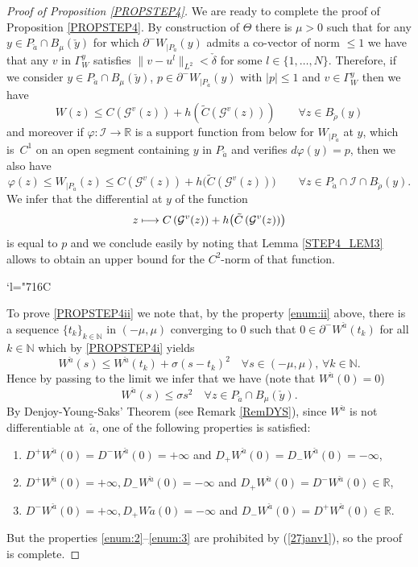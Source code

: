 \documentclass[JEP,XML,SOM,Unicode,NoFloatCountersInSection,published]{cedram}
\newcommand{\Changelback}{\mathcode`l="716C}
\newcommand\mto{\mathchoice{\longmapsto}{\mapsto}{\mapsto}{\mapsto}}
\newcommand\R{\mathbb R}
\newcommand\N{\mathbb N}
\theoremstyle{definition}
\begin{document}
\begin{proof}[Proof of Proposition \ref{PROPSTEP4}]
We are ready to complete the proof of Proposition \ref{PROPSTEP4}. By construction of $\Theta$ there is $\mu>0$ such that for any $y\in P_{\check{a}} \cap B_{\mu}(\check{y})$ for which $\partial^-W_{|P_{\check{a}}}(y)$ admits a co-vector of norm $\leq 1$ we have that any $v$ in $\Gamma_W^y$ satisfies $\|v-u^l\|_{L^2} < \check{\delta}$ for some $l\in \{1, \ldots, N\}$. Therefore, if we consider $y\in P_{\check{a}} \cap B_{\mu}(\check{y})$, $p \in \partial^-W_{|P_{\check{a}}}(y)$ with $|p|\leq 1$ and $v \in \Gamma_W^y$ then we have
\[
W(z) \leq C\left(\mathcal{G}^{v}(z)\right) + h\left(\tilde{C}\left(\mathcal{G}^{v}(z)\right)\right) \qquad \forall z \in B_{\check{\rho}}(y)
\]
and moreover if $\varphi: \mathcal{I} \to \R$ is a support function from below for $W_{|P_{\check{a}}}$ at $y$, which is~$C^1$ on an open segment containing $y$ in $P_{\check{a}}$ and verifies $d\varphi(y)=p$, then we also have
\[
\varphi (z) \leq W_{|P_{\check{a}}}(z) \leq C\left(\mathcal{G}^{v}(z)\right) + h\bigl(\tilde{C}\left(\mathcal{G}^{v}(z)\right)\bigr) \qquad \forall z \in P_{\check{a}} \cap \mathcal{I} \cap B_{\check{\rho}}(y).
\]
We infer that the differential at $y$ of the function
\[
z \mto C\left(\mathcal{G}^{v}(z)\right) + h\bigl(\tilde{C}\left(\mathcal{G}^{v}(z)\right)\bigr)
\]
is equal to $p$ and we conclude easily by noting that Lemma \ref{STEP4_LEM3} allows to obtain an upper bound for the $C^2$-norm of that function.

\Changelback

To prove \eqref{PROPSTEP4ii} we note that, by the property \eqref{enum:ii} above, there is a sequence $\{t_k\}_{k\in \N}$ in $(-\mu,\mu)$ converging to $0$ such that $0\in \partial^-W^{\check{a}}(t_k)$ for all $k\in \N$ which by \eqref{PROPSTEP4i} yields
\[
W^{\check{a}}(s) \leq W^{\check{a}}(t_k) +\sigma (s-t_k)^2 \quad \forall s \in (-\mu,\mu), \, \forall k \in \N.
\]
Hence by passing to the limit we infer that we have (note that $W^{\check{a}}(0)=0$)
\begin{equation}\label{27janv1}
W^{\check{a}}(s) \leq \sigma s^2 \quad \forall z \in P_{\check{a}} \cap B_{\mu}(\check{y}).
\end{equation}
By Denjoy-Young-Saks' Theorem (see Remark \ref{RemDYS}), since $W^{\check{a}}$ is not differentiable at~$\check{a}$, one of the following properties is satisfied:
\begin{enumerate}
\item\label{enum:2}
$D^+W^{\check{a}}(0)=D^-W^{\check{a}}(0)=+\infty$ and $D_+W^{\check{a}}(0)=D_-W^{\check{a}}(0)=-\infty$,
\item\label{enum:3}
$D^+W^{\check{a}}(0)=+\infty, D_-W^{\check{a}}(0)=-\infty$ and $D_+W^{\check{a}}(0)=D^-W^{\check{a}}(0)\in \R$,
\item\label{enum:4}
$D^-W^{\check{a}}(0)=+\infty, D_+W{\check{a}}(0)=-\infty$ and $D_-W^{\check{a}}(0)=D^+W^{\check{a}}(0)\in \R$.
\end{enumerate}
But the properties \eqref{enum:2}--\eqref{enum:3} are prohibited by (\ref{27janv1}), so the proof is complete.
\end{proof}
\end{document}
